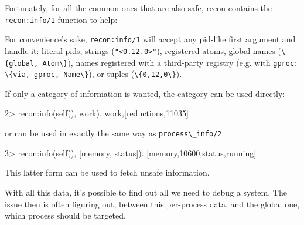 \documentclass[11pt, oneside]{book}   	%
\newcommand{\otpapp}[1]{\Verb`#1`}
\newcommand{\function}[1]{\Verb`#1`}
\newcommand{\expression}[1]{\Verb`#1`}
\begin{document}
Fortunately, for all the common ones that are also safe, recon contains the \expression{recon:info/1} function to help:


For convenience's sake, \expression{recon:info/1} will accept any pid-like first argument and handle it: literal pids, strings (\expression{"<0.12.0>"}), registered atoms, global names (\expression{\{global, Atom\}}), names registered with a third-party registry (e.g. with \otpapp{gproc}: \expression{\{via, gproc, Name\}}), or tuples (\expression{\{0,12,0\}}). 

If only a category of information is wanted, the category can be used directly:

\begin{VerbatimEshell}
2> recon:info(self(), work).
{work,[{reductions,11035}]}
\end{VerbatimEshell}

or can be used in exactly the same way as \function{process\_info/2}:

\begin{VerbatimEshell}
3> recon:info(self(), [memory, status]).
[{memory,10600},{status,running}]
\end{VerbatimEshell}

This latter form can be used to fetch unsafe information.

With all this data, it's possible to find out all we need to debug a system. The issue then is often figuring out, between this per-process data, and the global one, which process should be targeted.
\end{document}
